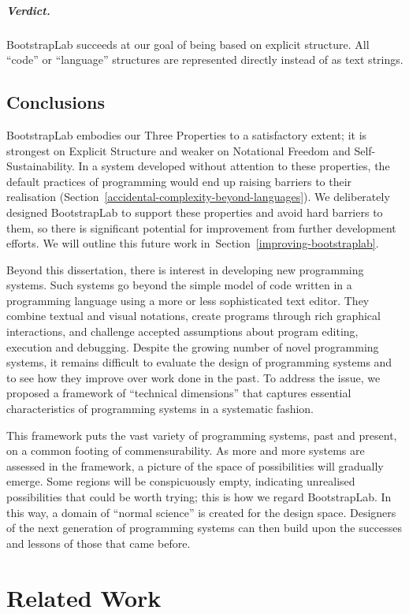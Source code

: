 \documentclass[ twoside,openright,titlepage,numbers=noenddot,headinclude,footinclude,cleardoublepage=empty,abstract=on,
                BCOR=5mm,paper=a4,fontsize=11pt
                ]{scrreprt}
\theoremstyle{definition}
\begin{document}
\paragraph{Verdict.}

BootstrapLab succeeds at our goal of being based on explicit structure.
All ``code'' or ``language'' structures are represented directly instead
of as text strings.

\hypertarget{conclusions}{\section{Conclusions}\label{conclusions}}

BootstrapLab embodies our Three Properties to a satisfactory extent; it
is strongest on Explicit Structure and weaker on Notational Freedom and
Self-Sustainability. In a system developed without attention to these
properties, the default practices of programming would end up raising
barriers to their realisation
(Section~\ref{accidental-complexity-beyond-languages}). We deliberately
designed BootstrapLab to support these properties and avoid hard
barriers to them, so there is significant potential for improvement from
further development efforts. We will outline this future work
in~Section~\ref{improving-bootstraplab}.

Beyond this dissertation, there is interest in developing new
programming systems. Such systems go beyond the simple model of code
written in a programming language using a more or less sophisticated
text editor. They combine textual and visual notations, create programs
through rich graphical interactions, and challenge accepted assumptions
about program editing, execution and debugging. Despite the growing
number of novel programming systems, it remains difficult to evaluate
the design of programming systems and to see how they improve over work
done in the past. To address the issue, we proposed a framework of
``technical dimensions'' that captures essential characteristics of
programming systems in a systematic fashion.

This framework puts the vast variety of programming systems, past and
present, on a common footing of commensurability. As more and more
systems are assessed in the framework, a picture of the space of
possibilities will gradually emerge. Some regions will be conspicuously
empty, indicating unrealised possibilities that could be worth trying;
this is how we regard BootstrapLab. In this way, a domain of ``normal
science'' is created for the design space. Designers of the next
generation of programming systems can then build upon the successes and
lessons of those that came before.
\clearpage{}
\cleardoublepage
\clearpage{}\hypertarget{ch-related-work}{\chapter{Related Work}\label{ch-related-work}}
\end{document}
